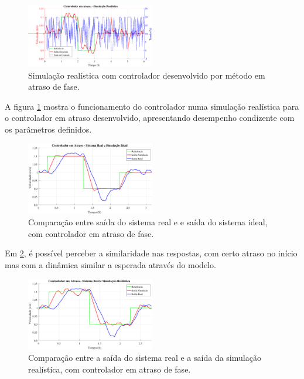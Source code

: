 \documentclass[conference,harvard,brazil,english]{sbatex}
\begin{document}
            \begin{figure}[H]
                \centering
                \includegraphics[width=0.5\textwidth]{imagens/atraso/simulacaoRealisticaAtraso.eps}
                \caption{Simulação realística com controlador desenvolvido por método em atraso de fase.}
                \label{fig:cont_atraso_simu}
            \end{figure}
            
            A figura \ref{fig:cont_atraso_simu} mostra o funcionamento do controlador numa simulação realística para o controlador em atraso desenvolvido, apresentando desempenho condizente com os parâmetros definidos.
            
            \begin{figure}[H]
                \centering
                \includegraphics[width=0.5\textwidth]{imagens/atraso/compRealIdeal.eps}
                \caption{Comparação entre saída do sistema real e e saída do sistema ideal, com controlador em atraso de fase.}
                \label{fig:cont_atraso}
            \end{figure}
            
            Em \ref{fig:cont_atraso}, é possível perceber a similaridade nas respostas, com certo atraso no início mas com a dinâmica similar a esperada através do modelo.
            
            \begin{figure}[H]
                \centering
                \includegraphics[width=0.5\textwidth]{imagens/atraso/compRealRealistica.eps}
                \caption{Comparação entre a saída do sistema real e a saída da simulação realística, com controlador em atraso de fase.}
                \label{fig:realistica_poli}
            \end{figure}
            
\end{document}

